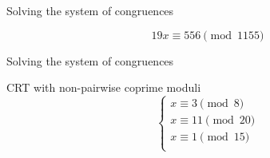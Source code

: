 \begin{frame}{Solving the system of congruences}
  \begin{exampleblock}{}
	\[
	  19x \equiv 556 \pmod{1155}
	\]
  \end{exampleblock}
\end{frame}
\begin{frame}{Solving the system of congruences}
  \begin{exampleblock}{CRT with non-pairwise coprime moduli}
	\[
	  \begin{cases}
		x \equiv 3 \pmod{8} \\
		x \equiv 11 \pmod{20} \\
		x \equiv 1 \pmod{15} \\
	  \end{cases}
	\]
  \end{exampleblock}
\end{frame}
